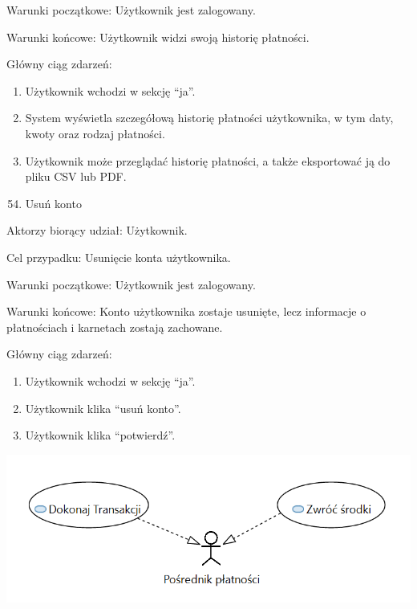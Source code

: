 \documentclass[
]{article}
\providecommand{\tightlist}{%
  \setlength{\itemsep}{0pt}\setlength{\parskip}{0pt}}
\begin{document}
{Warunki początkowe: Użytkownik jest zalogowany.}

{Warunki końcowe: Użytkownik widzi swoją historię płatności.}

{Główny ciąg zdarzeń:}

\begin{enumerate}
\tightlist
\item
  {Użytkownik wchodzi w sekcję ``ja''.}
\item
  {System wyświetla szczegółową historię płatności użytkownika, w tym
  daty, kwoty oraz rodzaj płatności.}
\item
  {Użytkownik może przeglądać historię płatności, a także eksportować ją
  do pliku CSV lub PDF.}
\end{enumerate}

{}

\begin{enumerate}
\setcounter{enumi}{53}
\tightlist
\item
  {Usuń konto}
\end{enumerate}

{Aktorzy biorący udział: Użytkownik.}

{Cel przypadku: Usunięcie konta użytkownika.}

{Warunki początkowe: Użytkownik jest zalogowany.}

{Warunki końcowe: Konto użytkownika zostaje usunięte, lecz informacje o
płatnościach i karnetach zostają zachowane.}

{Główny ciąg zdarzeń:}

\begin{enumerate}
\tightlist
\item
  {Użytkownik wchodzi w sekcję ``ja''.}
\item
  {Użytkownik klika ``usuń konto''.}
\item
  {Użytkownik klika ``potwierdź''.}
\end{enumerate}

\includegraphics{diagrams/use_cases/posrednik_platnosci.png}
\end{document}
